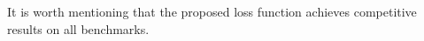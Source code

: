It is worth mentioning that the proposed loss function achieves competitive results on all benchmarks.
